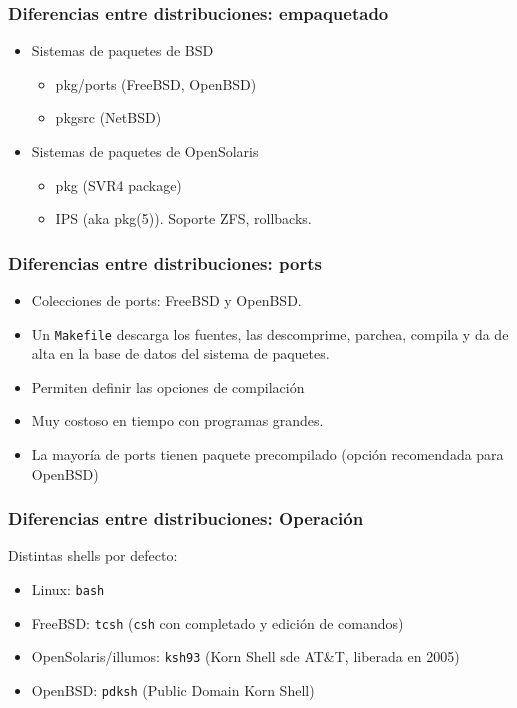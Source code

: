 \documentclass{beamer}
\begin{document}
\begin{frame}
\frametitle{Diferencias entre distribuciones: empaquetado}

\begin{itemize}
\item Sistemas de paquetes de BSD
	\begin{itemize}
	\item \alert{pkg/ports} (FreeBSD, OpenBSD)
	\item \alert{pkgsrc} (NetBSD)
	\end{itemize}

\item Sistemas de paquetes de OpenSolaris
	\begin{itemize}
	\item \alert{pkg} (SVR4 package)
	\item \alert{IPS} (aka \alert{pkg(5)}). Soporte ZFS, rollbacks.
	\end{itemize}
\end{itemize}

\end{frame}



\begin{frame}
\frametitle{Diferencias entre distribuciones: ports}

\begin{itemize}
	\item Colecciones de ports: FreeBSD y OpenBSD.
	\item Un \texttt{Makefile} descarga los fuentes, las descomprime, parchea, compila y da de alta en la base de datos del sistema de paquetes.
	\item Permiten definir las opciones de compilación 
	\item Muy costoso en tiempo con programas grandes. 
	\item La mayoría de ports tienen paquete precompilado (opción recomendada para OpenBSD)
\end{itemize}

\end{frame}




\begin{frame}
\frametitle{Diferencias entre distribuciones: Operación}

Distintas shells por defecto:

\begin{itemize}
\item Linux: \texttt{bash}
\item FreeBSD: \texttt{tcsh} (\texttt{csh} con completado y edición de comandos)
\item OpenSolaris/illumos: \texttt{ksh93} (Korn Shell sde AT\&T, liberada en 2005)
\item OpenBSD: \texttt{pdksh} (Public Domain Korn Shell)
\end{itemize}

\end{frame}
\end{document}
